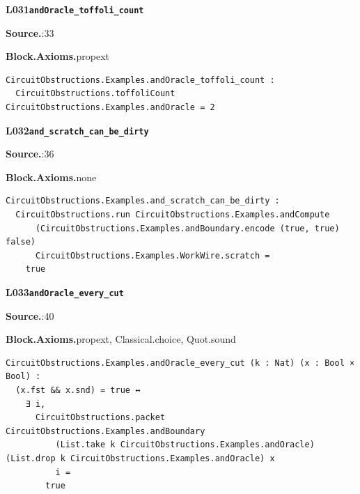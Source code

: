 \par\medskip\noindent\begin{minipage}{\textwidth}
{\small\bfseries L031\enspace\texttt{andOracle\_toffoli\_count}\par}
{\footnotesize\raggedright\textbf{Source.}\enspace{}:33\par
\textbf{Block.}\quad\textbf{Axioms.}\enspace propext\par}\nopagebreak
\begin{lstlisting}
CircuitObstructions.Examples.andOracle_toffoli_count :
  CircuitObstructions.toffoliCount CircuitObstructions.Examples.andOracle = 2
\end{lstlisting}
\end{minipage}\par

\par\medskip\noindent\begin{minipage}{\textwidth}
{\small\bfseries L032\enspace\texttt{and\_scratch\_can\_be\_dirty}\par}
{\footnotesize\raggedright\textbf{Source.}\enspace{}:36\par
\textbf{Block.}\quad\textbf{Axioms.}\enspace none\par}\nopagebreak
\begin{lstlisting}
CircuitObstructions.Examples.and_scratch_can_be_dirty :
  CircuitObstructions.run CircuitObstructions.Examples.andCompute
      (CircuitObstructions.Examples.andBoundary.encode (true, true) false)
      CircuitObstructions.Examples.WorkWire.scratch =
    true
\end{lstlisting}
\end{minipage}\par

\par\medskip\noindent\begin{minipage}{\textwidth}
{\small\bfseries L033\enspace\texttt{andOracle\_every\_cut}\par}
{\footnotesize\raggedright\textbf{Source.}\enspace{}:40\par
\textbf{Block.}\quad\textbf{Axioms.}\enspace propext, Classical.choice, Quot.sound\par}\nopagebreak
\begin{lstlisting}
CircuitObstructions.Examples.andOracle_every_cut (k : Nat) (x : Bool × Bool) :
  (x.fst && x.snd) = true ↔
    ∃ i,
      CircuitObstructions.packet CircuitObstructions.Examples.andBoundary
          (List.take k CircuitObstructions.Examples.andOracle) (List.drop k CircuitObstructions.Examples.andOracle) x
          i =
        true
\end{lstlisting}
\end{minipage}\par

